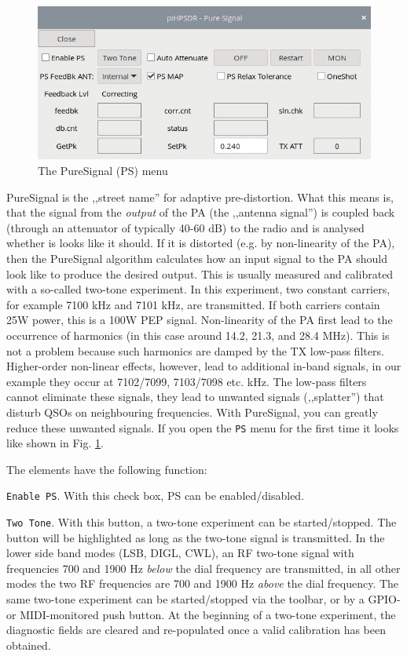 \documentclass[12pt]{book}
\def\rett#1{\texttt{\color{red}#1}}
\def\bltt#1{\texttt{\color{blue}#1}}
\begin{document}
\begin{figure}[ht]
\center
\includegraphics[scale=0.45]{PSMenu.png}
\caption{The PureSignal (PS) menu}
\label{fig:PSMenu}
\end{figure}

PureSignal is the ,,street name'' for adaptive pre-distortion. What this means is, that
the signal from the \textit{output} of the PA (the ,,antenna signal'') is coupled
back (through an attenuator of typically 40-60 dB) to the radio and is analysed
whether is looks like it should. If it is distorted (e.g. by non-linearity of the PA),
then the PureSignal algorithm calculates how an input signal to the PA should look like
to produce the desired output. This is usually measured and calibrated with a so-called
two-tone experiment. In this experiment, two constant carriers, for example 7100 kHz
and 7101 kHz, are transmitted. If both carriers contain 25W power, this is
a 100W PEP signal. Non-linearity of the PA first lead to the occurrence of harmonics
(in this case around 14.2, 21.3, and 28.4 MHz). This is not a problem because
such harmonics are  damped by the TX low-pass filters. Higher-order non-linear effects,
however, lead to additional in-band signals, in our example they occur at
7102/7099, 7103/7098 etc. kHz. The low-pass filters cannot eliminate these signals,
they lead to unwanted signals (,,splatter'') that disturb QSOs on neighbouring
frequencies. With PureSignal, you can greatly reduce these unwanted signals.
If you open the \bltt{PS} menu for the first time it looks like shown in Fig.
\ref{fig:PSMenu}.



The elements have the following function:

\rett{Enable PS}. With this check box, PS can be enabled/disabled.

\rett{Two Tone}. With this button, a two-tone experiment can be started/stopped. The button
will be highlighted as long as the two-tone signal is transmitted. In the lower side band
modes (LSB, DIGL, CWL), an RF two-tone signal with frequencies 700 and 1900 Hz
\textit{below} the dial frequency are transmitted, in all other modes the two
RF frequencies are 700 and 1900 Hz \textit{above} the dial frequency. The same two-tone
experiment can be started/stopped via the toolbar, or by a GPIO- or MIDI-monitored
push button. At the beginning of a two-tone experiment, the diagnostic fields
are cleared and re-populated once a valid calibration has been obtained.
\end{document}
